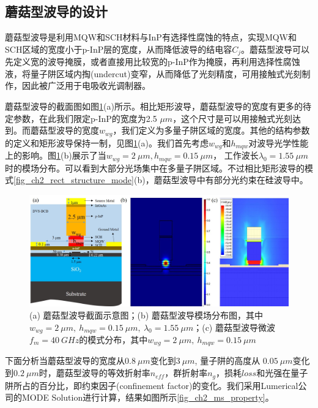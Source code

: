 \subsection{蘑菇型波导的设计}
蘑菇型波导是利用MQW和SCH材料与InP有选择性腐蚀的特点，实现MQW和SCH区域的宽度小于p-InP层的宽度，从而降低波导的结电容$C_j$。蘑菇型波导可以先定义宽的波导掩膜，或者直接用比较宽的p-InP作为掩膜，再利用选择性腐蚀液，将量子阱区域内掏(undercut)变窄，从而降低了光刻精度，可用接触式光刻制作，因此被广泛用于电吸收光调制器\cite{chiu2005enhanced, kuo2008high, tang201150, tang2012over, tang2012energy, chen2011forty}。

蘑菇型波导的截面图如图\ref{fig_ch2_ms_structure_mode}(a)所示。相比矩形波导，蘑菇型波导的宽度有更多的待定参数，在此我们限定p-InP的宽度为2.5 $\mu m$，这个尺寸是可以用接触式光刻达到。而蘑菇型波导的宽度$w_{wg}$，我们定义为多量子阱区域的宽度。其他的结构参数的定义和矩形波导保持一制，见图\ref{fig_ch2_ms_structure_mode}(a)。我们首先考虑$w_{wg}$和$h_{mqw}$对波导光学性能上的影响。图\ref{fig_ch2_ms_structure_mode}(b)展示了当$w_{wg} = 2 ~\mu m, h_{mqw} = 0.15 ~\mu m$， 工作波长$\lambda_0 = 1.55~\mu m$时的模场分布。可以看到大部分光场集中在多量子阱区域。不过相比矩形波导的模式\ref{fig_ch2_rect_structure_mode}(b)，蘑菇型波导中有部分光约束在硅波导中。
\begin{figure}[htb]
	\centering
	\includegraphics[width=16cm]{./Pictures/fig_ch2_ms_structure_mode.jpg}
	\caption{(a) 蘑菇型波导截面示意图；(b) 蘑菇型波导模场分布图，其中$w_{wg} = 2~ \mu m,~h_{mqw} = 0.15 ~\mu m,~\lambda_0 = 1.55~\mu m$；(c) 蘑菇型波导微波$f_m = 40~GHz$的模式分布，其中$w_{wg} = 2~\mu m,~h_{mqw} = 0.15~\mu m$}
	\label{fig_ch2_ms_structure_mode}
\end{figure}

下面分析当蘑菇型波导的宽度从$0.8 ~\mu m$变化到$3~\mu m$, 量子阱的高度从 $0.05 ~\mu m$变化到$0.2 ~\mu m$时，蘑菇型波导的等效折射率$n_{eff}$，群折射率$n_g$，损耗$loss$和光强在量子阱所占的百分比，即约束因子(confinement factor)的变化。我们采用Lumerical公司的MODE Solution进行计算\cite{modesolution}，结果如图所示\ref{fig_ch2_ms_property}。

